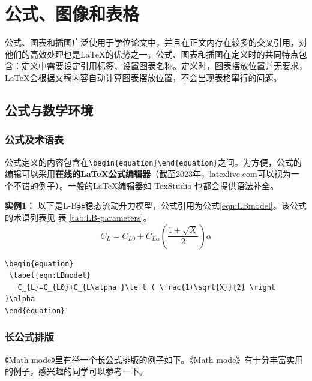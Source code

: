 \chapter{公式、图像和表格}
\label{chap:example}

公式、图表和插图广泛使用于学位论文中，并且在正文内存在较多的交叉引用，对他们的高效处理也是\LaTeX{}的优势之一。公式、图表和插图在定义时的共同特点包含：定义中需要设定引用标签、设置图表名称。定义时，图表摆放位置并无要求，\LaTeX{}会根据文稿内容自动计算图表摆放位置，不会出现表格窜行的问题。

\section{公式与数学环境}

\subsection{公式及术语表}
\label{sec:eqn}

公式定义的内容包含在\verb|\begin{equation}|\verb|\end{equation}|之间。为方便，公式的编辑可以采用\textbf{在线的\LaTeX{}公式编辑器}（截至2023年，\href{https://www.latexlive.com/}{latexlive.com}可以视为一个不错的例子）。一般的\LaTeX{}编辑器如 TexStudio 也都会提供语法补全。

{\bf{实例1：}} 以下是L-B非稳态流动升力模型，公式引用为公式\ref{eqn:LBmodel}。该公式的术语列表见 表 \ref{tab:LB-parameters}。
\begin{equation}
 \label{eqn:LBmodel}
   C_{L}=C_{L0}+C_{L\alpha }\left ( \frac{1+\sqrt{X}}{2} \right )\alpha 
\end{equation}

\begin{lstlisting}[language={[LaTeX]TeX}, caption={L-B非稳态流动升力模型}]
\begin{equation}
 \label{eqn:LBmodel}
   C_{L}=C_{L0}+C_{L\alpha }\left ( \frac{1+\sqrt{X}}{2} \right )\alpha 
\end{equation}
\end{lstlisting}

\subsection{长公式排版}


《Math mode》里有举一个长公式排版的例子如下。《Math mode》有十分丰富实用的例子，感兴趣的同学可以参考一下。

